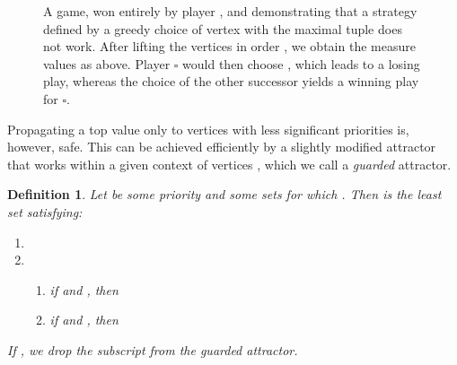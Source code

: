 \documentclass{eptcs}
\newtheorem{defi}{Definition}
\newenvironment{definition}{\begin{defi} \rm }{\end{defi}}
\newcommand{\odd}{\ensuremath{\square}\xspace}
\begin{document}
\begin{figure}[h!]
\centering
{}
\caption{A game, won entirely by player , and demonstrating
that a strategy defined by a greedy choice of vertex with the maximal 
tuple does not work. After lifting the vertices in order , we obtain the measure values as above. Player \odd would then choose , which leads to a losing play, whereas the choice of the other successor  yields a winning play for \odd.}
\label{fig:greedywrong}
\end{figure}


Propagating a top value only to vertices with less significant
priorities is, however, safe. This can be achieved efficiently by
a slightly modified attractor that works within a given context of vertices , 
which we call a \emph{guarded} attractor.
\begin{definition}
Let  be some priority and  some sets for which
. 
Then  is the least set  satisfying:
\begin{enumerate}
 \item 
 
 \item 
 \begin{enumerate}
  \item if  and , then 
  \item if  and , then 
 \end{enumerate}
\end{enumerate}
If , we drop the subscript  from the guarded attractor.
\end{definition}


\newcommand{\exttuples}[1]{\mathbb{M}^{#1,\textsf{ext}}}
\def\extprog{newProg}
\end{document}
